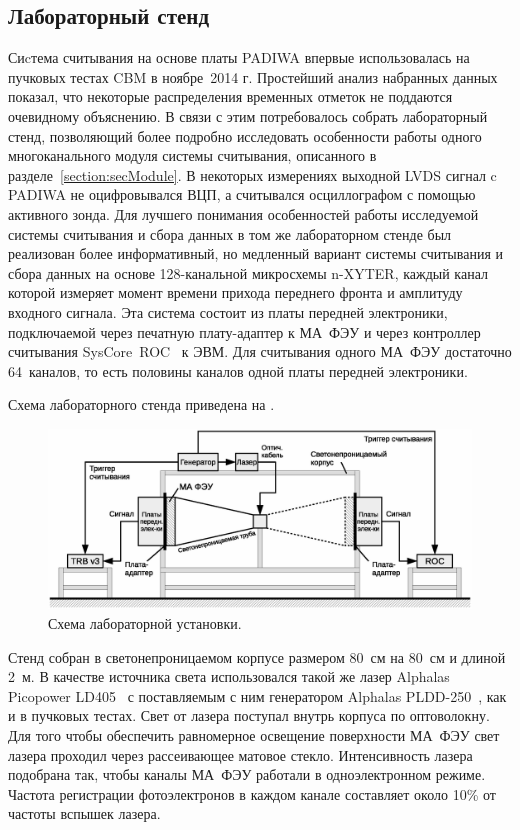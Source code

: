 \subsection{Лабораторный стенд}\label{section:secLabSetup}

Сиcтема считывания на основе платы PADIWA впервые использовалась на пучковых тестах CBM в ноябре~2014 г. Простейший анализ набранных данных показал, что некоторые распределения временных отметок не поддаются очевидному объяснению. В связи с этим потребовалось собрать лабораторный стенд, позволяющий более подробно исследовать особенности работы одного многоканального модуля системы считывания, описанного в разделе~\ref{section:secModule}. В некоторых измерениях выходной LVDS сигнал c PADIWA не оцифровывался ВЦП, а считывался осциллографом с помощью активного зонда. Для лучшего понимания особенностей работы исследуемой системы считывания и сбора данных в том же лабораторном стенде был реализован более информативный, но медленный вариант системы считывания и сбора данных на основе 128-канальной микросхемы n-XYTER, каждый канал которой измеряет момент времени прихода переднего фронта и амплитуду входного сигнала. Эта система состоит из платы передней электроники, подключаемой через печатную плату-адаптер к МА~ФЭУ и через контроллер считывания SysCore~ROC~\cite{SYSCORE} к ЭВМ. Для считывания одного МА~ФЭУ достаточно 64~каналов, то есть половины каналов одной платы передней электроники.

Схема лабораторного стенда приведена на .

\begin{figure}[H]
\centering
\includegraphics[width=1.0\textwidth]{pictures/12_Lab_setup_3_rus.eps}
\caption{Схема лабораторной установки.}
\label{fig:LabSetup}
\end{figure}

Стенд собран в светонепроницаемом корпусе размером 80~см на 80~см и длиной 2~м. В качестве источника света использовался такой же лазер Alphalas Picopower LD405~\cite{ALPHALAS} с поставляемым с ним генератором Alphalas PLDD-250~\cite{ALPHALAS}, как и в пучковых тестах. Свет от лазера поступал внутрь корпуса по оптоволокну.
Для того чтобы обеспечить равномерное освещение поверхности МА~ФЭУ свет лазера проходил через рассеивающее матовое стекло.
Интенсивность лазера подобрана так, чтобы каналы МА~ФЭУ работали в одноэлектронном режиме. Частота регистрации фотоэлектронов в каждом канале составляет около 10\% от частоты вспышек лазера.

